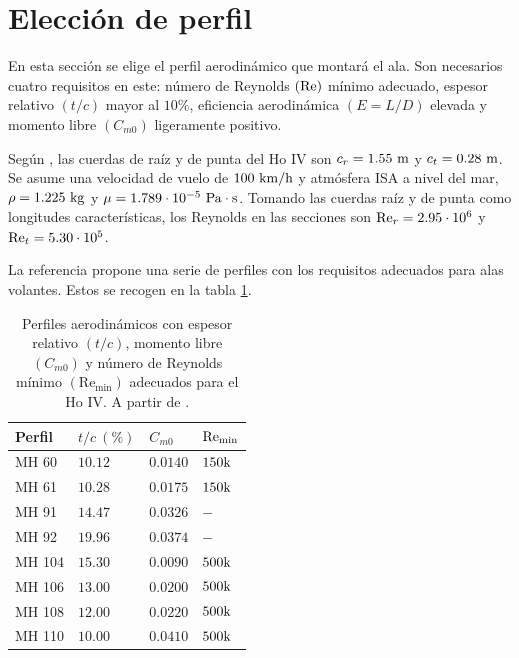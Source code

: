 
\section{Elección de perfil}

En esta sección se elige el perfil aerodinámico que montará el ala. Son necesarios cuatro requisitos en este: número de Reynolds $\left( \reynolds \right)$ mínimo adecuado, espesor relativo $\left( t/c \right)$ mayor al $10\%$, eficiencia aerodinámica $\left( E = L / D \right)$ elevada y momento libre $\left( C_{m0} \right)$ ligeramente positivo. 

Según \cite{performace_hoIV}, las cuerdas de raíz y de punta del Ho IV son $c_r = 1.55 \ \meter$ y $c_t = 0.28 \ \meter$. Se asume una velocidad de vuelo de $100 \ \kilo\meter / \hour$ y atmósfera ISA a nivel del mar, $\rho = 1.225 \ \kilo\gram$ y $\mu = 1.789 \cdot 10^{-5} \ \pascal \cdot \second$. Tomando las cuerdas raíz y de punta como longitudes características, los Reynolds en las secciones son $\reynolds_r = 2.95 \cdot 10^6$ y $\reynolds_t = 5.30 \cdot 10^5$.

La referencia \cite{aerotools_1} propone una serie de perfiles con los requisitos adecuados para alas volantes. Estos se recogen en la tabla \ref{tab:posibles_perfiles}.
\begin{table}[h]
    \centering
    \begin{tabular}{llll}
        \toprule[0.50mm]
        Perfil & $t/c \ \left( \% \right)$ & $C_{m0}$ & $\reynolds_\text{min}$ \\
        \midrule[0.25mm]
        MH 60   & $10.12$ & $0.0140$ & $150 \kilo$ \\
        MH 61   & $10.28$ & $0.0175$ & $150 \kilo$ \\
        MH 91   & $14.47$ & $0.0326$ & $-$ \\
        MH 92   & $19.96$ & $0.0374$ & $-$ \\
        MH 104  & $15.30$ & $0.0090$ & $500 \kilo$ \\
        MH 106  & $13.00$ & $0.0200$ & $500 \kilo$ \\
        MH 108  & $12.00$ & $0.0220$ & $500 \kilo$ \\
        MH 110  & $10.00$ & $0.0410$ & $500 \kilo$ \\
        \bottomrule[0.50mm]
    \end{tabular}
    \caption{Perfiles aerodinámicos con espesor relativo $\left( t/c \right)$, momento libre $\left( C_{m0} \right)$ y número de Reynolds mínimo $\left( \mathrm{Re}_\text{min} \right)$ adecuados para el Ho IV. A partir de \cite{aerotools_1}.}
    \label{tab:posibles_perfiles}
    \vspace{-4mm}
\end{table}

